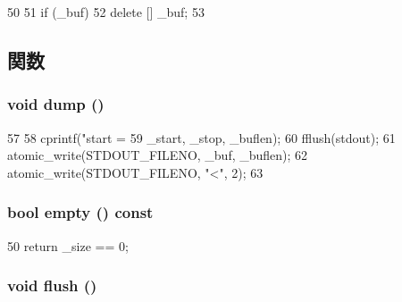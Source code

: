 \begin{DoxyCode}
50 {
51     if (_buf)
52         delete [] _buf;
53 }
\end{DoxyCode}


\subsection{関数}
\hypertarget{classCircleBuf_accd2600060dbaee3a3b41aed4034c63c}{
\subsubsection[{dump}]{\setlength{\rightskip}{0pt plus 5cm}void dump ()}}
\label{classCircleBuf_accd2600060dbaee3a3b41aed4034c63c}



\begin{DoxyCode}
57 {
58     cprintf("start = %
59             _start, _stop, _buflen);
60     fflush(stdout);
61     atomic_write(STDOUT_FILENO, _buf, _buflen);
62     atomic_write(STDOUT_FILENO, "<\n", 2);
63 }
\end{DoxyCode}
\hypertarget{classCircleBuf_ac6e61de369e994009e36f344f99c15ad}{
\subsubsection[{empty}]{\setlength{\rightskip}{0pt plus 5cm}bool empty () const}}
\label{classCircleBuf_ac6e61de369e994009e36f344f99c15ad}



\begin{DoxyCode}
50 { return _size == 0; }
\end{DoxyCode}
\hypertarget{classCircleBuf_adac116554b543b7c4228c018a85882f5}{
\subsubsection[{flush}]{\setlength{\rightskip}{0pt plus 5cm}void flush ()}}
\label{classCircleBuf_adac116554b543b7c4228c018a85882f5}



